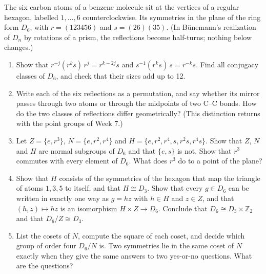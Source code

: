 \documentclass[11pt,a4paper]{article}
\newcommand{\Z}{\mathbb{Z}}
\newcommand{\problem}[1]{\par\vspace{0.9em}\noindent{\bfseries #1}\par\vspace{0.1em}}
\begin{document}
\problem{2. The symmetries of benzene}
The six carbon atoms of a benzene molecule sit at the vertices of a regular hexagon, labelled $1, \dots, 6$ counterclockwise. Its symmetries in the plane of the ring form $D_6$, with $r = (123456)$ and $s = (26)(35)$. (In Bünemann's realization of $D_n$ by rotations of a prism, the reflections become half-turns; nothing below changes.)
\begin{enumerate}
  \item Show that $r^{-j}(r^k s)\, r^j = r^{k - 2j} s$ and $s^{-1}(r^k s)\, s = r^{-k} s$. Find all conjugacy classes of $D_6$, and check that their sizes add up to 12.
  \item Write each of the six reflections as a permutation, and say whether its mirror passes through two atoms or through the midpoints of two C--C bonds. How do the two classes of reflections differ geometrically? (This distinction returns with the point groups of Week 7.)
  \item Let $Z = \{e, r^3\}$, $N = \{e, r^2, r^4\}$ and $H = \{e, r^2, r^4, s, r^2 s, r^4 s\}$. Show that $Z$, $N$ and $H$ are normal subgroups of $D_6$ and that $\{e, s\}$ is not. Show that $r^3$ commutes with every element of $D_6$. What does $r^3$ do to a point of the plane?
  \item Show that $H$ consists of the symmetries of the hexagon that map the triangle of atoms $1, 3, 5$ to itself, and that $H \cong D_3$. Show that every $g \in D_6$ can be written in exactly one way as $g = hz$ with $h \in H$ and $z \in Z$, and that $(h, z) \mapsto hz$ is an isomorphism $H \times Z \to D_6$. Conclude that $D_6 \cong D_3 \times \Z_2$ and that $D_6 / Z \cong D_3$.
  \item List the cosets of $N$, compute the square of each coset, and decide which group of order four $D_6/N$ is. Two symmetries lie in the same coset of $N$ exactly when they give the same answers to two yes-or-no questions. What are the questions?
\end{enumerate}
\end{document}
